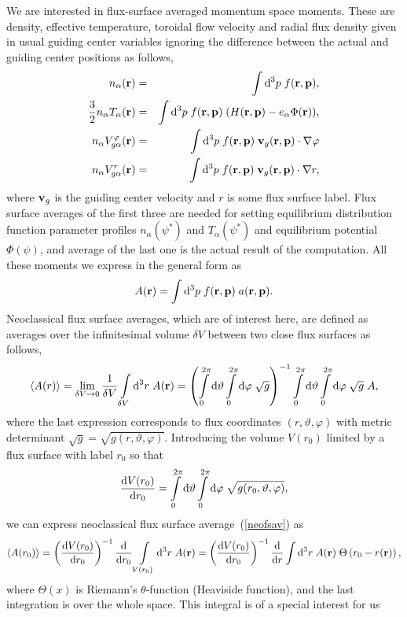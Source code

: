 \documentclass[preprint,prb,aps]{revtex4-1}
\newcommand{\be}[1]{\begin{equation} \label{#1}}
\newcommand{\ee}{\end{equation}}
\newcommand{\bea}[1]{\begin{eqnarray} \label{#1}}
\newcommand{\eea}{\end{eqnarray}}
\newcommand{\eq}[1]{(\ref{#1})}
\newcommand{\br}{{\bf r}}
\newcommand{\bp}{{\bf p}}
\newcommand{\bv}{{\bf v}}
\newcommand{\rd}{{\rm d}}
\begin{document}
\noindent
We are interested in flux-surface averaged momentum space moments.
These are density, effective temperature, toroidal flow velocity and radial flux density
given in usual guiding center variables ignoring the difference between the actual and 
guiding center positions as follows,
\bea{moments}
n_\alpha(\br) &=& \int \rd^3 p\; f(\br,\bp),
\\
\frac{3}{2} n_\alpha T_\alpha(\br) &=& \int \rd^3 p\;f(\br,\bp)\; (H(\br,\bp)-e_\alpha\Phi(\br)),
\\
n_\alpha V_{g\alpha}^\varphi(\br) &=& \int \rd^3 p\;f(\br,\bp)\; \bv_g(\br,\bp)\cdot\nabla\varphi
\label{Vgphi}
\\
n_\alpha V_{g\alpha}^r(\br) &=& \int \rd^3 p\;f(\br,\bp)\; \bv_g(\br,\bp)\cdot\nabla r,
\label{partflux}
\eea
where $\bv_g$ is the guiding center velocity and $r$ is some flux surface label. 
Flux surface averages of the first three are needed for setting equilibrium distribution 
function parameter profiles
$n_\alpha(\psi^\ast)$ and $T_\alpha(\psi^\ast)$ and equilibrium potential $\Phi(\psi)$,
and average of the last one is the actual result of the computation.
All these moments we express in the general form as
\be{genmom}
A(\br) = \int \rd^3 p\; f(\br,\bp)\; a(\br,\bp).
\ee
Neoclassical flux surface averages, which are of interest here, are defined as averages over the
infinitesimal volume $\delta V$ between two close flux surfaces as follows,
\be{neofsav}
\left\langle A(r) \right\rangle
=
\lim_{\delta V\rightarrow 0}\frac{1}{\delta V}\int\limits_{\delta V}\rd^3 r \; A(\br)
=
\left(\int\limits_0^{2\pi}\rd\vartheta\int\limits_0^{2\pi}\rd\varphi\;\sqrt{g}\right)^{-1}
\int\limits_0^{2\pi}\rd\vartheta\int\limits_0^{2\pi}\rd\varphi\;\sqrt{g} \;A,
\ee
where the last expression corresponds to flux coordinates $(r,\vartheta,\varphi)$
with metric determinant $\sqrt{g}=\sqrt{g(r,\vartheta,\varphi)}$.
Introducing the volume $V(r_0)$ limited by a flux surface with label $r_0$  so that
\be{dVdr}
\frac{\rd V(r_0)}{\rd r_0}
=\int\limits_0^{2\pi}\rd\vartheta\int\limits_0^{2\pi}\rd\varphi\;
\sqrt{g(r_0,\vartheta,\varphi)},
\ee
we can express
neoclassical flux surface average~\eq{neofsav} as
\be{neofsav_expr}
\left\langle A(r_0) \right\rangle
=
\left(\frac{\rd V(r_0)}{\rd r_0}\right)^{-1}
\frac{\rd}{\rd r_0}\int\limits_{V(r_0)}\rd^3 r \; A(\br)
=
\left(\frac{\rd V(r_0)}{\rd r_0}\right)^{-1}
\frac{\rd}{\rd r}\int\rd^3 r \; A(\br)\;\Theta\left(r_0-r(\br)\right),
\ee
where $\Theta\left(x\right)$ is Riemann's $\theta$-function (Heaviside function), and the
last integration is over the whole space. This integral is of a special interest for us
\end{document}
